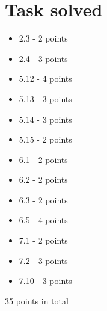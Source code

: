 \documentclass{article}
\begin{document}
\section*{Task solved}

\begin{itemize}
    \item 2.3 - 2 points
    \item 2.4 - 3 points
    \item 5.12 - 4 points
    \item 5.13 - 3 points
    \item 5.14 - 3 points
    \item 5.15 - 2 points
    \item 6.1 - 2 points
    \item 6.2 - 2 points
    \item 6.3 - 2 points
    \item 6.5 - 4 points
    \item 7.1 - 2 points
    \item 7.2 - 3 points
    \item 7.10 - 3 points
\end{itemize}

35 points in total

\newpage



\newpage



\newpage



\newpage



\newpage



\newpage



\newpage



\newpage



\newpage



\newpage



\newpage



\newpage



\newpage


\end{document}
